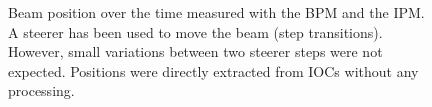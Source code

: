 \begin{figure}[!ht]
	\begin{center}
		
	\end{center}
  \caption[Beam position over the time measured with the BPM and the IPM]
  {Beam position over the time measured with the BPM and the IPM.
  A steerer has been used to move the beam (step transitions).
  However, small variations between two steerer steps were not expected. 
  Positions were directly extracted from IOCs without any processing.}
	\label{chap4:BPMvsIPM}
\end{figure}
